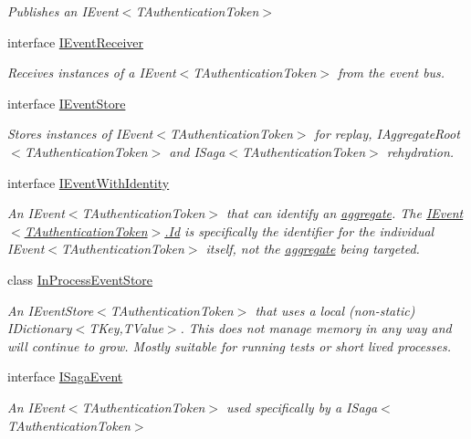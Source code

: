 \begin{DoxyCompactItemize}
\begin{DoxyCompactList}\small\item\em Publishes an I\+Event$<$\+T\+Authentication\+Token$>$ \end{DoxyCompactList}\item 
interface \hyperlink{interfaceCqrs_1_1Events_1_1IEventReceiver}{I\+Event\+Receiver}
\begin{DoxyCompactList}\small\item\em Receives instances of a I\+Event$<$\+T\+Authentication\+Token$>$ from the event bus. \end{DoxyCompactList}\item 
interface \hyperlink{interfaceCqrs_1_1Events_1_1IEventStore}{I\+Event\+Store}
\begin{DoxyCompactList}\small\item\em Stores instances of I\+Event$<$\+T\+Authentication\+Token$>$ for replay, I\+Aggregate\+Root$<$\+T\+Authentication\+Token$>$ and I\+Saga$<$\+T\+Authentication\+Token$>$ rehydration. \end{DoxyCompactList}\item 
interface \hyperlink{interfaceCqrs_1_1Events_1_1IEventWithIdentity}{I\+Event\+With\+Identity}
\begin{DoxyCompactList}\small\item\em An I\+Event$<$\+T\+Authentication\+Token$>$ that can identify an \hyperlink{}{aggregate}. The \hyperlink{interfaceCqrs_1_1Events_1_1IEvent_a2974e13d307c62c5cc438d668ff1783b_a2974e13d307c62c5cc438d668ff1783b}{I\+Event$<$\+T\+Authentication\+Token$>$.\+Id} is specifically the identifier for the individual I\+Event$<$\+T\+Authentication\+Token$>$ itself, not the \hyperlink{}{aggregate} being targeted. \end{DoxyCompactList}\item 
class \hyperlink{classCqrs_1_1Events_1_1InProcessEventStore}{In\+Process\+Event\+Store}
\begin{DoxyCompactList}\small\item\em An I\+Event\+Store$<$\+T\+Authentication\+Token$>$ that uses a local (non-\/static) I\+Dictionary$<$\+T\+Key,\+T\+Value$>$. This does not manage memory in any way and will continue to grow. Mostly suitable for running tests or short lived processes. \end{DoxyCompactList}\item 
interface \hyperlink{interfaceCqrs_1_1Events_1_1ISagaEvent}{I\+Saga\+Event}
\begin{DoxyCompactList}\small\item\em An I\+Event$<$\+T\+Authentication\+Token$>$ used specifically by a I\+Saga$<$\+T\+Authentication\+Token$>$ \end{DoxyCompactList}\item 

\end{DoxyCompactItemize}
